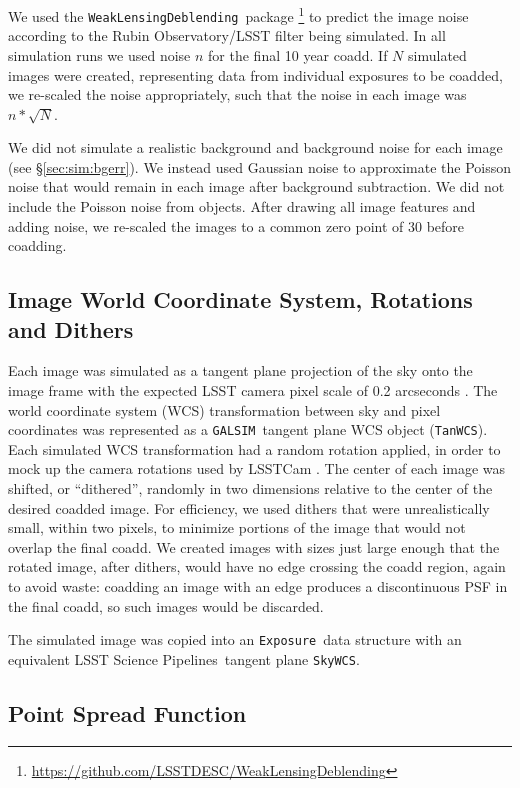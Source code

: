 \documentclass[twocolumn,twocolappendix,astrosym]{openjournal}
\newcommand{\descwl}{\texttt{WeakLensingDeblending}}
\newcommand{\galsim}{\texttt{GALSIM}}
\newcommand{\calexp}{\texttt{Exposure}}
\newcommand{\dm}{LSST Science Pipelines}
\begin{document}
We used the \descwl\ package
\citep{DESCWLSanchez2021}\footnote{\url{https://github.com/LSSTDESC/WeakLensingDeblending}}
to predict the image noise according to the Rubin Observatory/LSST filter being
simulated.  In all simulation runs we used noise $n$ for the final 10 year
coadd.  If $N$ simulated images were created, representing data from individual
exposures to be coadded, we re-scaled the noise appropriately, such that the
noise in each image was $n * \sqrt{N}$.

We did not simulate a realistic background and background noise for each image
(see \S \ref{sec:sim:bgerr}).  We instead used Gaussian noise to approximate
the Poisson noise that would remain in each image after background subtraction.
We did not include the Poisson noise from objects.  After drawing all image
features and adding noise, we re-scaled the images to a common zero point of
30 before coadding.

\subsection{Image World Coordinate System, Rotations and Dithers} \label{sec:sim:rotdith}

Each image was simulated as a tangent plane projection of the sky onto the
image frame with the expected LSST camera pixel scale of 0.2 arcseconds
\citep{IvezicLSST2008}.  The world coordinate system (WCS) transformation between
sky and pixel coordinates was represented as a \galsim\ tangent plane
WCS object (\texttt{TanWCS}).
Each simulated WCS transformation had a random rotation applied, in order to
mock up the camera rotations used by LSSTCam \citep{IvezicLSST2008}.  The
center of each image was shifted, or ``dithered'', randomly in two dimensions
relative to the center of the desired coadded image.  For efficiency, we used
dithers that were unrealistically small, within two pixels, to minimize portions of the
image that would not overlap the final coadd.  We created images with sizes just
large enough that the rotated image, after dithers, would have no edge
crossing the coadd region, again to avoid waste:  coadding an image with an
edge produces a discontinuous PSF in the final coadd, so such images would be
discarded.

The simulated image was copied into an \calexp\ data structure with an
equivalent \dm\ tangent plane \texttt{SkyWCS}.

\subsection{Point Spread Function} \label{sec:sim:psfs}
\end{document}
